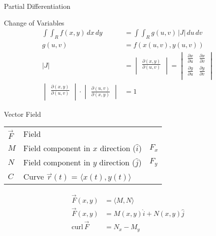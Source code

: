 \begin{section}{Partial Differentiation}
  \begin{section}{Change of Variables}
    \begin{align*}
      \int\int_R{f(x,y) \,dx \,dy} &=\int\int_R{g(u,v)\, |J| \,du \,dv} \\
      g(u,v) &= f(x(u,v),y(u,v)) \\
      |J| &=
            \begin{vmatrix}
              \frac{\partial{(x,y)}}{\partial{(u,v)}}\\
            \end{vmatrix} =
      \begin{vmatrix}
        \frac{\partial{x}}{\partial{u}} & \frac{\partial{x}}{\partial{v}}\\
        \frac{\partial{y}}{\partial{u}} & \frac{\partial{y}}{\partial{v}}\\
      \end{vmatrix} \\
      \begin{vmatrix}
        \frac{\partial{(x,y)}}{\partial{(u,v)}}\\
      \end{vmatrix}
      \cdot
      \begin{vmatrix}
        \frac{\partial{(u,v)}}{\partial{(x,y)}}
      \end{vmatrix}
      &= 1
    \end{align*}
  \end{section}

  \begin{section}{Vector Field}
    \begin{tabular}{l l l}
     $\vec{F}$ & Field & \\
     $M$ & Field component in $x$ direction ($\hat{i}$) & $F_x$ \\
     $N$ & Field component in $y$ direction ($\hat{j}$) & $F_y$ \\
     $C$ & Curve $\vec{r}(t)$ = $ \langle x(t),y(t) \rangle $ & \\
   \end{tabular}
    \begin{align*}
      \vec{F}(x,y) &= \langle M,N \rangle \\
      \vec{F}(x,y) &= M(x,y)\hat{i} + N(x,y)\hat{j}\\
      \text{curl}\,\vec{F} &= N_x - M_y  \\
    \end{align*}
  \end{section}


\end{section}
